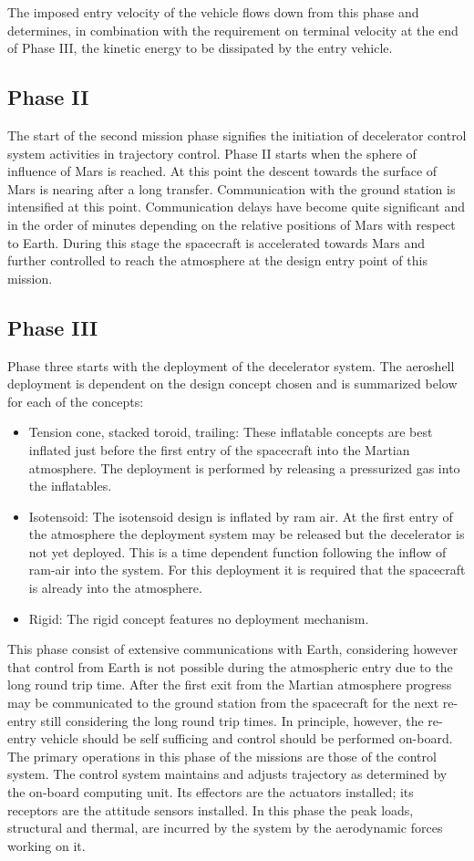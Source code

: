 The imposed entry velocity of the vehicle flows down from this phase and determines, in combination with the requirement on terminal velocity at the end of Phase III, the kinetic energy to be dissipated by the entry vehicle.

\subsection{Phase II}\label{sec:p2}
The start of the second mission phase signifies the initiation of decelerator control system activities in trajectory control. Phase II starts when the sphere of influence of Mars is reached.  At this point the descent towards the surface of Mars is nearing after a long transfer. Communication with the ground station is intensified at this point. Communication delays have become quite significant and in the order of minutes depending on the relative positions of Mars with respect to Earth. During this stage the spacecraft is accelerated towards Mars and further controlled to reach the atmosphere at the design entry point of this mission.

\subsection{Phase III}\label{sec:p3}

Phase three starts with the deployment of the decelerator system. The aeroshell deployment is dependent on the design concept chosen and is summarized below for each of the concepts:
\begin{itemize}
\item Tension cone, stacked toroid, trailing: These inflatable concepts are best inflated just before the first entry of the spacecraft into the Martian atmosphere. The deployment is performed by releasing a pressurized gas into the inflatables.
\item Isotensoid: The isotensoid design is inflated by ram air. At the first entry of the atmosphere the deployment system may be released but the decelerator is not yet deployed. This is a time dependent function following the inflow of ram-air into the system. For this deployment it is required that the spacecraft is already into the atmosphere.
\item Rigid: The rigid concept features no deployment mechanism.
\end{itemize}
This phase consist of extensive communications with Earth, considering however that control from Earth is not possible during the atmospheric entry due to the long round trip time. After the first exit from the Martian atmosphere progress may be communicated to the ground station from the spacecraft for the next re-entry still considering the long round trip times. In principle, however, the re-entry vehicle should be self sufficing and control should be performed on-board. The primary operations in this phase of the missions are those of the control system. The control system maintains and adjusts trajectory as determined by the on-board computing unit. Its effectors are the actuators installed; its receptors are the attitude sensors installed. In this phase the peak loads, structural and thermal, are incurred by the system by the aerodynamic forces working on it.

